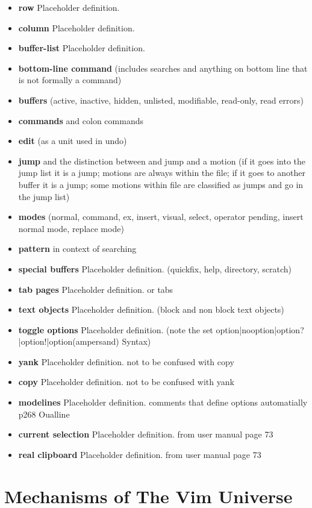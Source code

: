 \documentclass[12pt, oneside]{book}
\begin{document}
\begin{itemize}[leftmargin=*, label={}]
  \item \textbf{row} Placeholder definition.
  \item \textbf{column} Placeholder definition.
  \item \textbf{buffer-list} Placeholder definition.
  \item \textbf{bottom-line command} (includes searches and anything on bottom line that is not formally a command)
  \item \textbf{buffers} (active, inactive, hidden, unlisted, modifiable, read-only, read errors)
  \item \textbf{commands} and colon commands
  \item \textbf{edit} (as a unit used in undo)
  \item \textbf{jump} and the distinction between and jump and a motion (if it goes into the jump list it is a jump; motions are always within the file; if it goes to another buffer it is a jump; some motions within file are classified as jumps and go in the jump list)
  \item \textbf{modes} (normal, command, ex, insert, visual, select, operator pending, insert normal mode, replace mode)
  \item \textbf{pattern} in context of searching
  \item \textbf{special buffers} Placeholder definition.  (quickfix, help, directory, scratch)
  \item \textbf{tab pages} Placeholder definition.  or tabs
  \item \textbf{text objects} Placeholder definition.  (block and non block text objects)
  \item \textbf{toggle options} Placeholder definition.  (note the set option|nooption|option?|option!|option(ampersand) Syntax)
  \item \textbf{yank} Placeholder definition. not to be confused with copy
  \item \textbf{copy} Placeholder definition. not to be confused with yank
  \item \textbf{modelines} Placeholder definition.  comments that define options automatially p268 Oualline
  \item \textbf{current selection} Placeholder definition.  from user manual page 73
  \item \textbf{real clipboard} Placeholder definition.  from user manual page 73
\end{itemize}

\chapter{Mechanisms of The Vim Universe}
\end{document}
